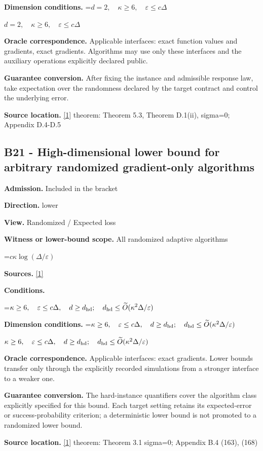\documentclass[10pt,a4paper]{article}
\newcommand{\AtlasMath}[1]{\par\begingroup\centering\setbox0=\hbox{$\displaystyle #1$}\ifdim\wd0>1.4\linewidth\typeout{ATLAS WIDE FORMULA: \the\wd0}\fi\ifdim\wd0>\linewidth\resizebox{\linewidth}{!}{\box0}\else\box0\fi\par\endgroup}
\newcommand{\AtlasInlineMath}[1]{\begingroup\setbox0=\hbox{$#1$}\ifdim\wd0>.4\linewidth\endgroup\AtlasMath{#1}\else\endgroup$#1$\fi}
\begin{document}
\textbf{Dimension conditions.} \AtlasInlineMath{d=2,\quad\kappa\ge6,\quad\varepsilon\le c\Delta}

\textbf{Oracle correspondence.} Applicable interfaces: exact function values and gradients, exact gradients. Algorithms may use only these interfaces and the auxiliary operations explicitly declared public.

\textbf{Guarantee conversion.} After fixing the instance and admissible response law, take expectation over the randomness declared by the target contract and control the underlying error.

\textbf{Source location.} \href{https://arxiv.org/pdf/2609.03990}{[1]} theorem: Theorem 5.3, Theorem D.1(ii), sigma=0; Appendix D.4-D.5

\subsection{B21 - High-dimensional lower bound for arbitrary randomized gradient-only algorithms}
\textbf{Admission.} Included in the bracket

\textbf{Direction.} lower

\textbf{View.} Randomized / Expected loss

\textbf{Witness or lower-bound scope.} All randomized adaptive algorithms

\AtlasMath{c\kappa\log(\Delta/\varepsilon)}
\textbf{Sources.} \href{https://arxiv.org/pdf/2609.03990}{[1]}

\textbf{Conditions.} 
\AtlasMath{\kappa\ge6,\quad\varepsilon\le c\Delta,\quad d\ge d_{\rm hd};\quad d_{\rm hd}\le\widetilde{O}(\kappa^2\Delta/\varepsilon)}


\textbf{Dimension conditions.} \AtlasInlineMath{\kappa\ge6,\quad\varepsilon\le c\Delta,\quad d\ge d_{\rm hd};\quad d_{\rm hd}\le\widetilde{O}(\kappa^2\Delta/\varepsilon)}

\textbf{Oracle correspondence.} Applicable interfaces: exact gradients. Lower bounds transfer only through the explicitly recorded simulations from a stronger interface to a weaker one.

\textbf{Guarantee conversion.} The hard-instance quantifiers cover the algorithm class explicitly specified for this bound. Each target setting retains its expected-error or success-probability criterion; a deterministic lower bound is not promoted to a randomized lower bound.

\textbf{Source location.} \href{https://arxiv.org/pdf/2609.03990}{[1]} theorem: Theorem 3.1 sigma=0; Appendix B.4 (163), (168)
\end{document}
